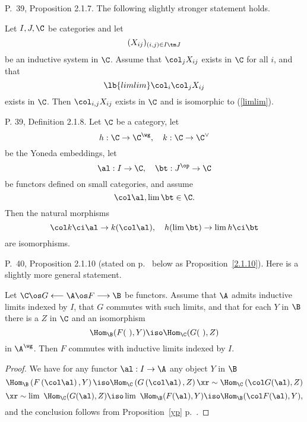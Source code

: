 \documentclass[12pt]{article}
\theoremstyle{remark}
\theoremstyle{definition}
\begin{document}
%

\begin{s} 
P.~39, Proposition 2.1.7. The following slightly stronger statement holds. 

Let $I,J,\C$ be categories and let 
$$
(X_{ij})_{(i,j)\in I\tm J}
$$ 
be an inductive system in $\C$. Assume that $\col_jX_{ij}$ exists in $\C$ for all $i$, and that 
\begin{equation}\lb{limlim}
\col_i\col_jX_{ij}
\end{equation}
exists in $\C$. Then $\col_{i,j}X_{ij}$ exists in $\C$ and is isomorphic to (\ref{limlim}).
\end{s}

%

\begin{s}
P. 39, Definition 2.1.8. Let $\C$ be a category, let 
$$
h:\C\to\C^\wg,\quad k:\C\to\C^\vee
$$ 
be the Yoneda embeddings, let 
$$
\al:I\to\C,\quad\bt:J^{\op}\to\C
$$ 
be functors defined on small categories, and assume 
$$
\col\al,\lim\bt\in\C.
$$ 
Then the natural morphisms 
$$
\col k\ci\al\to k(\col\al),\quad h(\lim\bt)\to\lim h\ci\bt
$$ 
are isomorphisms.
\end{s}

%

\begin{s} 
P.~40, Proposition 2.1.10 (stated on p.~ below as Proposition~\ref{2.1.10}). Here is a slightly more general statement. 
%
\begin{prop}
Let $
\C\os G\longleftarrow\A\os F\longrightarrow\B
$ be functors. Assume that $\A$ admits inductive limits indexed by $I$, that $G$ commutes with such limits, and that for each $Y$ in $\B$ there is a $Z$ in $\C$ and an isomorphism 
$$
\Hom_\B(F(\ ),Y)\iso\Hom_\C(G(\ ),Z)
$$
in $\A^\wg$. Then $F$ commutes with inductive limits indexed by $I$.
\end{prop}
%
\begin{proof}
We have for any functor $\al:I\to\A$ any object $Y$ in $\B$ 
$$ 
\Hom_\B\left(F\left(\col\al\right),Y\right)\iso
\Hom_\C\left(G\left(\col\al\right),Z\right)
\xr\sim
\Hom_\C\left(\col G(\al),Z\right)
$$
$$
\xr\sim\lim\ \Hom_\C(G(\al),Z)\iso\lim\ \Hom_\B(F(\al),Y)\iso\Hom_\B(\col F(\al),Y),
$$ 
and the conclusion follows from Proposition~\ref{yp} p.~.
\end{proof}
\end{s}

%
\end{document}

